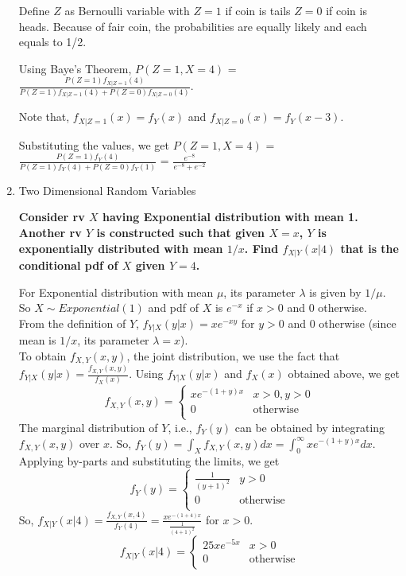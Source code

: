 \documentclass[12pt, oneside]{article}
\begin{document}
\begin{enumerate}
Define $Z$ as Bernoulli variable with $Z=1$ if coin is tails $Z=0$ if coin is heads. Because of fair coin, the probabilities are equally likely and each equals to 1/2. 

Using Baye's Theorem, 
$P(Z=1,X=4)$ = $\frac{P(Z=1)f_{X|Z=1}(4)}{P(Z=1)f_{X|Z=1}(4)+ P(Z=0)f_{X|Z=0}(4)}$.

Note that, $f_{X|Z=1}(x)=f_Y(x)$ and $f_{X|Z=0}(x)=f_Y(x-3)$.

Substituting the values, we get $P(Z=1,X=4)$ = $\frac{P(Z=1)f_Y(4)}{P(Z=1)f_Y(4)+ P(Z=0)f_Y(1)}$ = $\frac{e^{-8}}{e^{-8}+e^{-2}}$



\item Two Dimensional Random Variables

\noindent\textbf{Consider rv $X$ having Exponential distribution with mean 1. Another rv $Y$ is constructed such that given $X=x$, $Y$ is exponentially distributed with mean $1/x$. Find $f_{X|Y}(x|4)$ that is the conditional pdf of $X$ given $Y=4$.}

For Exponential distribution with mean $\mu$, its parameter $\lambda$ is given by $1/\mu$. So $X\sim Exponential(1)$ and pdf of $X$ is $e^{-x}$ if $x>0$ and $0$ otherwise. \\
From the definition of $Y$, $f_{Y|X}(y|x) = xe^{-xy}$ for $y>0$ and 0 otherwise (since mean is $1/x$, its parameter $\lambda=x$). \\
To obtain $f_{X,Y}(x,y)$, the joint distribution, we use the fact that $f_{Y|X}(y|x) = \frac{f_{X,Y}(x,y)}{f_X(x)}$. Using $f_{Y|X}(y|x)$ and $f_X(x)$ obtained above, we get
\[
    f_{X,Y}(x,y) = 
    \begin{cases}
               xe^{-(1+y)x} & x>0, y>0\\
               0 & \text{otherwise}\\
    \end{cases}
\]
The marginal distribution of $Y$, i.e., $f_Y(y)$ can be obtained by integrating $f_{X,Y}(x,y)$ over $x$.
So, $f_Y(y)=\int_X f_{X,Y}(x,y)dx = \int_0^\infty xe^{-(1+y)x}dx $. Applying by-parts and substituting the limits, we get 
\[
    f_Y(y) = 
    \begin{cases}
               \frac{1}{(y+1)^2} & y>0\\
               0 & \text{otherwise}\\
    \end{cases}
\]
So, $f_{X|Y}(x|4) = \frac{f_{X,Y}(x,4)}{f_Y(4)} = \frac{xe^{-(1+4)x}}{\frac{1}{(4+1)^2}}$ for $x>0$.
\[
    f_{X|Y}(x|4) = 
    \begin{cases}
               25xe^{-5x} & x>0\\
               0 & \text{otherwise}\\
    \end{cases}
\]




\end{enumerate}
\end{document}
